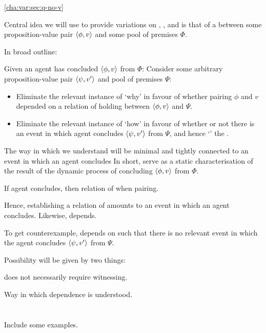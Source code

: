 \begin{note}
  \autoref{cha:var:sec:q-no-v}
\end{note}

\begin{note}
  Central idea we will use to provide variations on \qWhy{}, \qHow{}, and \issueInclusion{} is that of a \ros{} between some proposition-value pair \(\langle \phi, v \rangle\) and some pool of premises \(\Phi\).

  In broad outline:

  Given an agent has concluded \(\langle \phi, v \rangle\) from \(\Phi\):
  Consider some arbitrary proposition-value pair \(\langle \psi, v' \rangle\) and pool of premises \(\Psi\):
  \begin{itemize}
  \item
    Eliminate the relevant instance of `why' in favour of whether pairing \(\phi\) and \(v\) depended on a relation of \support{} holding between \(\langle \phi, v \rangle\) and \(\Psi\).
  \item
    Eliminate the relevant instance of `how' in favour of whether or not there is an event in which agent concludes \(\langle \psi, v' \rangle\) from \(\Psi\), and hence `' the \ros{}.
  \end{itemize}


  The way in which we understand  will be minimal and  tightly connected to an event in which an agent concludes
  In short, serve as a static characterisation of the result of the dynamic process of concluding \(\langle \phi, v \rangle\) from \(\Phi\).

 If agent concludes, then relation of \support{} when pairing.

  Hence, establishing a relation of \support{} amounts to an event in which an agent concludes.
  Likewise, depends.

  To get counterexample, depends on \ros{} such that there is no relevant event in which the agent concludes \(\langle \psi, v' \rangle\) from \(\Psi\).

  Possibility will be given by two things:

  \ros{} does not necessarily require witnessing.

  Way in which dependence is understood.
\end{note}


\section{}
\label{cha:var:ros}

{
  \color{red} Include some examples.
}

